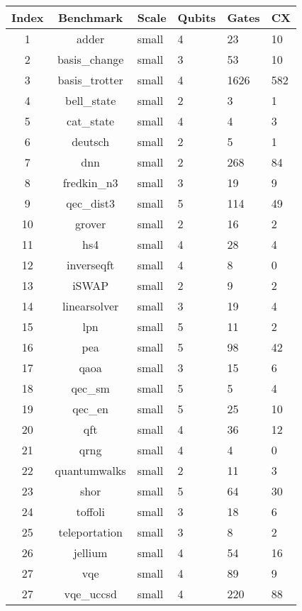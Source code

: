 \documentclass[10pt,a4paper]{article}
\newcommand{\<}{\langle}
\renewcommand{\>}{\rangle}
\begin{document}
\begin{table}[h]
\centering
\begin{tabularx}{\textwidth}{|c|c|X|X|X|X|}
\hline
\textbf{Index} & \textbf{Benchmark} & \textbf{Scale} & \textbf{Qubits} & \textbf{Gates} & \textbf{CX} \\
\hline
1 & adder & small & 4 & 23 & 10 \\
\hline
2 & basis\_change & small & 3 & 53 & 10 \\
\hline
3 & basis\_trotter & small & 4 & 1626 & 582 \\
\hline
4 & bell\_state & small & 2 & 3 & 1 \\
\hline
5 & cat\_state & small & 4 & 4 & 3 \\
\hline
6 & deutsch & small & 2 & 5 & 1 \\
\hline
7 & dnn & small & 2 & 268 & 84 \\
\hline
8 & fredkin\_n3 & small & 3 & 19 & 9 \\
\hline
9 & qec\_dist3 & small & 5 & 114 & 49 \\
\hline
10 & grover & small & 2 & 16 & 2 \\
\hline
11 & hs4 & small & 4 & 28 & 4 \\
\hline
12 & inverseqft & small & 4 & 8 & 0 \\
\hline
13 & iSWAP & small & 2 & 9 & 2 \\
\hline
14 & linearsolver & small & 3 & 19 & 4 \\
\hline
15 & lpn & small & 5 & 11 & 2 \\
\hline
16 & pea & small & 5 & 98 & 42 \\
\hline
17 & qaoa & small & 3 & 15 & 6 \\
\hline
18 & qec\_sm & small & 5 & 5 & 4 \\
\hline
19 & qec\_en & small & 5 & 25 & 10 \\
\hline
20 & qft & small & 4 & 36 & 12 \\
\hline
21 & qrng & small & 4 & 4 & 0 \\
\hline
22 & quantumwalks & small & 2 & 11 & 3 \\
\hline
23 & shor & small & 5 & 64 & 30 \\
\hline
24 & toffoli & small & 3 & 18 & 6 \\
\hline
25 & teleportation & small & 3 & 8 & 2 \\
\hline
26 & jellium & small & 4 & 54 & 16 \\
\hline
27 & vqe & small & 4 & 89 & 9 \\
\hline
27 & vqe\_uccsd & small & 4 & 220 & 88 \\

\end{tabularx}
\end{table}
\end{document}
